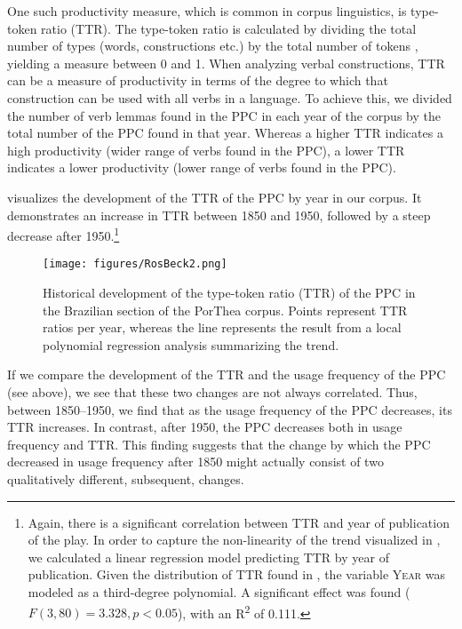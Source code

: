 \documentclass[output=paper,colorlinks,citecolor=brown]{langscibook}
\begin{document}
One such productivity measure, which is common in corpus linguistics, is type-token ratio (TTR). The type-token ratio is calculated by dividing the total number of types (words, constructions etc.) by the total number of tokens \parencite[253]{McEneryHardie2012}, yielding a measure between 0 and 1. When analyzing verbal constructions, TTR can be a measure of productivity in terms of the degree to which that construction can be used with all verbs in a language. To achieve this, we divided the number of verb lemmas found in the PPC in each year of the corpus by the total number of the PPC found in that year. Whereas a higher TTR indicates a high productivity (wider range of verbs found in the PPC), a lower TTR indicates a lower productivity (lower range of verbs found in the PPC).

 visualizes the development of the TTR of the PPC by year in our corpus. It demonstrates an increase in TTR between 1850 and 1950, followed by a steep decrease after 1950.\footnote{Again, there is a significant correlation between TTR and year of publication of the play. In order to capture the non-linearity of the trend visualized in , we calculated a linear regression model predicting TTR by year of publication. Given the distribution of TTR found in , the variable \textsc{Year} was modeled as a third-degree polynomial. A significant effect was found ($F(3, 80) = 3.328,\allowbreak p<0.05$), with an R\textsuperscript{2} of 0.111.}

\begin{figure}
\texttt{[image: figures/RosBeck2.png]}
\caption{Historical development of the type-token ratio (TTR) of the PPC in the Brazilian section of the PorThea corpus. Points represent TTR ratios per year, whereas the line represents the result from a local polynomial regression analysis summarizing the trend.}
\label{fig:rb2}
\end{figure}

If we compare the development of the TTR and the usage frequency of the PPC (see  above), we see that these two changes are not always correlated. Thus, between 1850--1950, we find that as the usage frequency of the PPC decreases, its TTR increases. In contrast, after 1950, the PPC decreases both in usage frequency and TTR. This finding suggests that the change by which the PPC decreased in usage frequency after 1850 might actually consist of two qualitatively different, subsequent, changes. 
\end{document}
